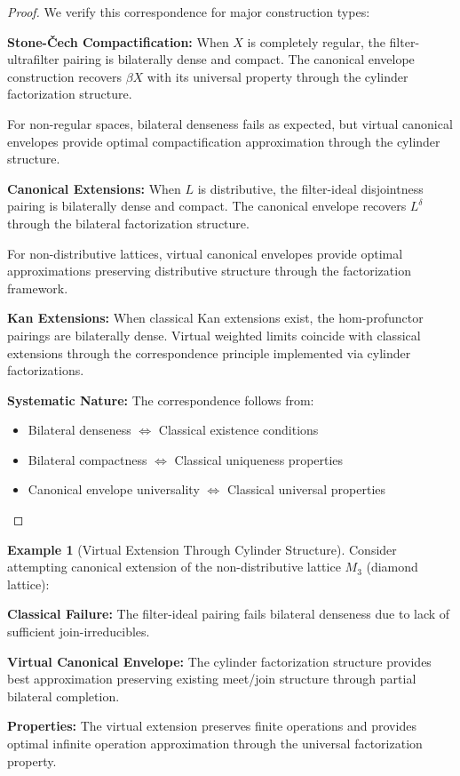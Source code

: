 \documentclass[11pt]{article}
\theoremstyle{plain}
\theoremstyle{definition}
\newtheorem{example}[theorem]{Example}
\theoremstyle{remark}
\begin{document}
\begin{proof}
We verify this correspondence for major construction types:

\textbf{Stone-Čech Compactification:} When $X$ is completely regular, the filter-ultrafilter pairing is bilaterally dense and compact. The canonical envelope construction recovers $\beta X$ with its universal property through the cylinder factorization structure.

For non-regular spaces, bilateral denseness fails as expected, but virtual canonical envelopes provide optimal compactification approximation through the cylinder structure.

\textbf{Canonical Extensions:} When $L$ is distributive, the filter-ideal disjointness pairing is bilaterally dense and compact. The canonical envelope recovers $L^{\delta}$ through the bilateral factorization structure.

For non-distributive lattices, virtual canonical envelopes provide optimal approximations preserving distributive structure through the factorization framework.

\textbf{Kan Extensions:} When classical Kan extensions exist, the hom-profunctor pairings are bilaterally dense. Virtual weighted limits coincide with classical extensions through the correspondence principle implemented via cylinder factorizations.

\textbf{Systematic Nature:} The correspondence follows from:
\begin{itemize}
\item Bilateral denseness $\Leftrightarrow$ Classical existence conditions
\item Bilateral compactness $\Leftrightarrow$ Classical uniqueness properties  
\item Canonical envelope universality $\Leftrightarrow$ Classical universal properties
\end{itemize}
\end{proof}

\begin{example}[Virtual Extension Through Cylinder Structure]
Consider attempting canonical extension of the non-distributive lattice $M_3$ (diamond lattice):

\textbf{Classical Failure:} The filter-ideal pairing fails bilateral denseness due to lack of sufficient join-irreducibles.

\textbf{Virtual Canonical Envelope:} The cylinder factorization structure provides best approximation preserving existing meet/join structure through partial bilateral completion.

\textbf{Properties:} The virtual extension preserves finite operations and provides optimal infinite operation approximation through the universal factorization property.
\end{example}
\end{document}
